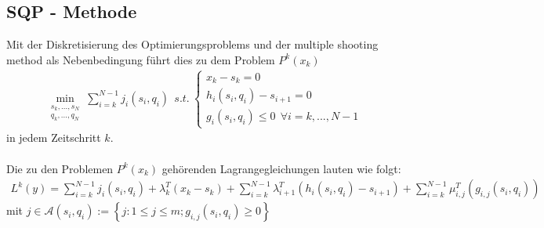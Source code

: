 \subsection{SQP - Methode}\label{subsec:SQP}
Mit der Diskretisierung des Optimierungsproblems und der multiple shooting method als Nebenbedingung führt dies zu dem Problem $P^k(x_k)$
\begin{align}
\min_{\begin{array}{c} s_{k},...,s_{N}\\ q_{k},...,q_{N} \end{array}} \sum_{i=k}^{N-1} j_{i}(s_{i},q_{i}) \ \  
  s.t. \ \left\lbrace \begin{array}{c}
  x_{k} - s_{k} = 0 \\
  h_i (s_i ,q_i ) - s_{i+1} = 0 \\
  g_i (s_i, q_i) \leq 0 \ \ \forall i = k, ... , N-1 \end{array} \right.
\end{align}
in jedem Zeitschritt $k$.\\
\\
Die zu den Problemen $ P^{k}(x_{k}) $ gehörenden Lagrangegleichungen lauten wie folgt:
  \begin{align}
  L^{k}(y) = \sum_{i=k}^{N-1} j_{i}(s_{i},q_{i})
  + \lambda_{k}^{T}(x_{k} - s_{k})
  + \sum_{i=k}^{N-1} \lambda_{i+1}^{T} (h_i (s_i ,q_i ) - s_{i+1})
  + \sum_{i=k}^{N-1} \mu_{i, j}^{T} (g_{i, j} (s_i, q_i))
  \end{align}
  mit $j \in \mathscr{A}(s_i, q_i):=\left\{ j: 1 \leq j \leq m; g_{i,j}(s_i, q_i)\geq 0 \right\}$

